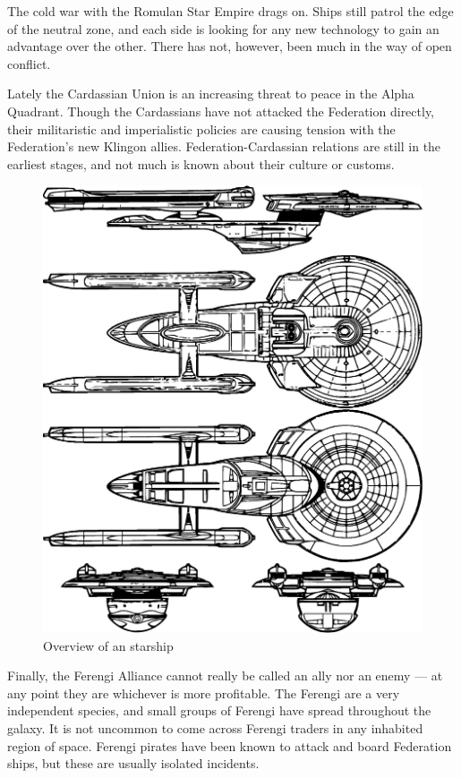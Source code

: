\documentclass[12pt]{article}
\begin{document}
The cold war with the Romulan Star Empire drags on. Ships still patrol the edge
of the neutral zone, and each side is looking for any new technology to gain an
advantage over the other. There has not, however, been much in the way of open
conflict.

Lately the Cardassian Union is an increasing threat to peace in the Alpha
Quadrant. Though the Cardassians have not attacked the Federation directly,
their militaristic and imperialistic policies are causing tension with the
Federation's new Klingon allies. Federation-Cardassian relations are still in
the earliest stages, and not much is known about their culture or customs.

\begin{figure}
    \centering
    \vspace{1em}
    \includegraphics[width=0.8\linewidth]{img/ExcelsiorRefit.eps}\\
    \vspace{2ex}
    \footnotesize Overview of an  starship
    \vspace{-2em}
\end{figure}

Finally, the Ferengi Alliance cannot really be called an ally nor an enemy ---
at any point they are whichever is more profitable. The Ferengi are a very
independent species, and small groups of Ferengi have spread throughout the
galaxy. It is not uncommon to come across Ferengi traders in any inhabited
region of space. Ferengi pirates have been known to attack and board Federation
ships, but these are usually isolated incidents.
\end{document}

